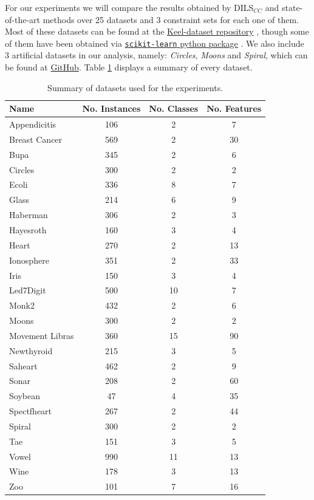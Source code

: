 \documentclass[review]{elsarticle}
\begin{document}
For our experiments we will compare the results obtained by DILS$_{CC}$ and state-of-the-art methods over 25 datasets and 3 constraint sets for each one of them. Most of these datasets can be found at the \href{https://sci2s.ugr.es/keel/category.php?cat=clas}{Keel-dataset repository} \cite{triguero2017keel}, though some of them have been obtained via
\href{https://scikit-learn.org/stable/datasets/index.html}{\texttt{scikit-learn} python package} \cite{scikit-learn}. We also include 3 artificial datasets in our analysis, namely: \textit{Circles}, \textit{Moons} and \textit{Spiral}, which can be found at \href{https://github.com/GermangUgr/DILS_CC}{GitHub}. Table \ref{tab:datasets} displays a summary of every dataset.

\begin{table}[!h]
	\centering
	\small
	\begin{tabular}{l c c c}
		\hline
		Name & No. Instances & No. Classes & No. Features \\
		\hline
		Appendicitis & 106 & 2 & 7 \\
		Breast Cancer & 569 & 2 & 30 \\
		Bupa & 345 & 2 & 6 \\
		Circles & 300 & 2 & 2 \\
		Ecoli & 336 & 8 & 7 \\
		Glass & 214 & 6 & 9 \\
		Haberman & 306 & 2 & 3 \\
		Hayesroth & 160 & 3 & 4 \\
		Heart & 270 & 2 & 13 \\
		Ionosphere & 351 & 2 & 33 \\
		Iris & 150 & 3 & 4 \\
		Led7Digit & 500 & 10 & 7 \\
		Monk2 & 432 & 2 & 6 \\
		Moons & 300 & 2 & 2 \\
		Movement Libras & 360 & 15 & 90 \\
		Newthyroid & 215 & 3 & 5 \\
		Saheart & 462 & 2 & 9 \\
		Sonar & 208 & 2 & 60 \\
		Soybean & 47 & 4 & 35 \\
		Spectfheart & 267 & 2 & 44 \\
		Spiral & 300 & 2 & 2 \\
		Tae & 151 & 3 & 5 \\
		Vowel & 990 & 11 & 13 \\
		Wine & 178 & 3 & 13 \\
		Zoo & 101 & 7 & 16 \\
		\hline

	\end{tabular}%
	\caption{Summary of datasets used for the experiments.}
	\label{tab:datasets}
\end{table}
\end{document}
